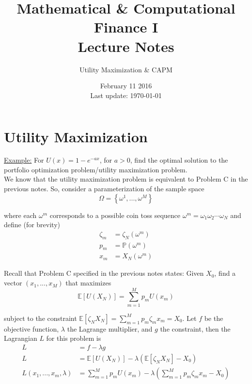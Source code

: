\documentclass[12pt]{article}
\newlength\tindent
\renewcommand{\indent}{\hspace*{\tindent}}
\renewcommand{\P}{\mathbb P}
\newcommand{\E}{\mathbb E}
\begin{document}
 
 
\title{Mathematical \& Computational Finance I\\Lecture Notes}
\author{Utility Maximization \& CAPM}
\date{February 11 2016 \\ Last update: \today{}}
\maketitle

\section{Utility Maximization}

\underline{Example:} For $U(x) = 1 - e^{-ax}$, for $a > 0$, find the optimal solution to the portfolio optimization problem/utility maximization problem. \\

\indent We know that the utility maximization problem is equivalent to Problem C in the previous notes. So, consider a parameterization of the sample space
\begin{equation*}
	\Omega = \left\{ \omega^1, ..., \omega^M \right\}
\end{equation*}

where each $\omega^m$ corresponds to a possible coin toss sequence $\omega^m = \omega_1\omega_2\cdots\omega_N$ and define (for brevity)
\begin{align*}
	\zeta_m &= \zeta_N(\omega^m) \\
	p_m &= \P(\omega^m) \\
	x_m &= X_N(\omega^m)
\end{align*}

\indent Recall that Problem C specified in the previous notes states: Given $X_0$, find a vector $(x_1, ..., x_M)$ that maximizes
\begin{equation*}
	\E[U(X_N)] = \sum^M_{m = 1} p_mU(x_m)
\end{equation*}

subject to the constraint $\E[\zeta_N X_N] = \sum^M_{m = 1} p_m\zeta_mx_m = X_0$. Let $f$ be the objective function, $\lambda$ the Lagrange multiplier, and $g$ the constraint, then the Lagrangian $L$ for this problem is
\begin{align*}
	L &= f - \lambda g \\
	L &= \E[U(X_N)] - \lambda(\E[\zeta_N X_N] - X_0) \\
	L(x_1,..., x_m,\lambda) &= \sum^M_{m = 1} p_mU(x_m) - \lambda \left( \sum^M_{m = 1} p_m \zeta_m x_m - X_0 \right) \\
\end{align*}
\end{document}
